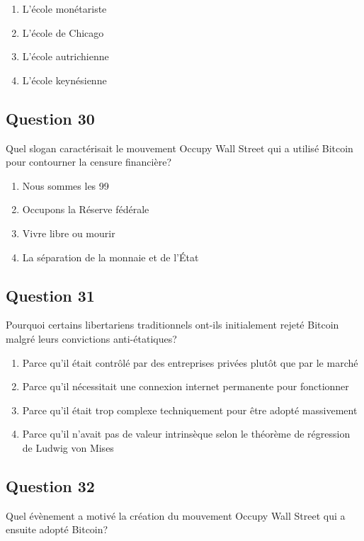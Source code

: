 \documentclass[12pt,a4paper]{article}
\begin{document}
\begin{enumerate}[label=\Alph*., leftmargin=*]
\item L'école monétariste
\item L'école de Chicago
\item L'école autrichienne
\item L'école keynésienne
\end{enumerate}

\bigskip


\subsection*{Question 30}
Quel slogan caractérisait le mouvement Occupy Wall Street qui a utilisé Bitcoin pour contourner la censure financière?

\begin{enumerate}[label=\Alph*., leftmargin=*]
\item Nous sommes les 99 %
\item Occupons la Réserve fédérale
\item Vivre libre ou mourir
\item La séparation de la monnaie et de l'État
\end{enumerate}

\bigskip


\subsection*{Question 31}
Pourquoi certains libertariens traditionnels ont-ils initialement rejeté Bitcoin malgré leurs convictions anti-étatiques?

\begin{enumerate}[label=\Alph*., leftmargin=*]
\item Parce qu'il était contrôlé par des entreprises privées plutôt que par le marché
\item Parce qu'il nécessitait une connexion internet permanente pour fonctionner
\item Parce qu'il était trop complexe techniquement pour être adopté massivement
\item Parce qu'il n'avait pas de valeur intrinsèque selon le théorème de régression de Ludwig von Mises
\end{enumerate}

\bigskip


\subsection*{Question 32}
Quel évènement a motivé la création du mouvement Occupy Wall Street qui a ensuite adopté Bitcoin?
\end{document}
